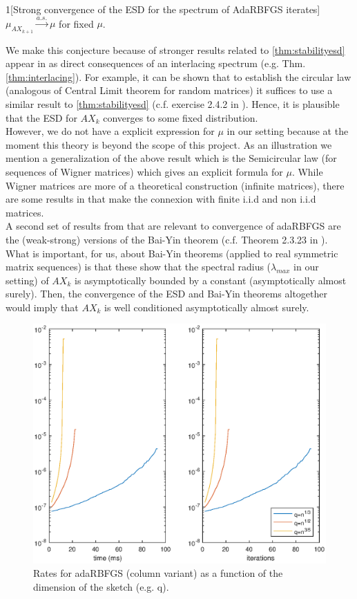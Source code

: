 \documentclass[12pt,conference,compsocconf]{IEEEtran}
\begin{document}
\begin{customconjecture}{1}[Strong convergence of the ESD for the spectrum of AdaRBFGS iterates]\label{conj:convergence}
	$\mu_{AX_{k+1}} \overset{a.s.}{\to} \mu$ for fixed $\mu$.
\end{customconjecture}
 
We make this conjecture because of stronger results related to \ref{thm:stabilityesd} appear in \cite{Tao} as direct consequences of an interlacing spectrum (e.g. Thm. \ref{thm:interlacing}). For example, it can be shown that to establish the circular law (analogous of Central Limit theorem for random matrices) it suffices to use a similar result to \ref{thm:stabilityesd} (c.f. exercise 2.4.2 in \cite{Tao}). Hence, it is plausible that the ESD for $AX_k$ converges to some fixed distribution.\\
However, we do not have a explicit expression for $\mu$ in our setting because at the moment this theory is beyond the scope of this project. As an illustration we mention a generalization of the above result which is the Semicircular law (for sequences of Wigner matrices) which gives an explicit formula for $\mu$. While Wigner matrices are more of a theoretical construction (infinite matrices), there are some results in \cite{Tao} that make the connexion with finite i.i.d and non i.i.d matrices.\\
A second set of results from \cite{Tao} that are relevant to convergence of adaRBFGS are the (weak-strong) versions of the Bai-Yin theorem (c.f. Theorem 2.3.23 in \cite{Tao}). What is important, for us, about Bai-Yin theorems (applied to real symmetric matrix sequences) is that these show that the spectral radius ($\lambda_{max}$ in our setting) of $AX_k$ is asymptotically bounded by a constant (asymptotically almost surely). Then, the convergence of the ESD and Bai-Yin theorems altogether would imply that $AX_k$ is well conditioned asymptotically almost surely.
\vspace{-3mm}
\begin{figure}[H]
  \centering
  \includegraphics[height=0.7\columnwidth,width=1.1\columnwidth]{ratedim.eps}   \vspace{-2mm}
  \caption{Rates for adaRBFGS (column variant) as a function of the dimension of the sketch (e.g. q). \label{fig:ratedim}}  
\end{figure}
\end{document}
